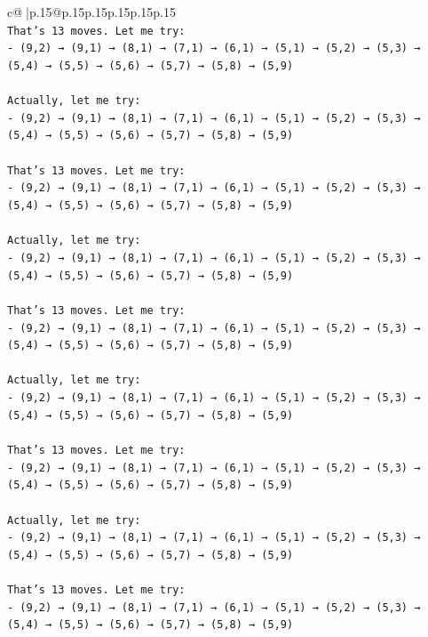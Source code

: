\documentclass{article}
\begin{document}
{\begin{supertabular}{c@{$\;$}|p{.15\linewidth}@{}p{.15\linewidth}p{.15\linewidth}p{.15\linewidth}p{.15\linewidth}p{.15\linewidth}}
{{{\\ 
\texttt{That's 13 moves. Let me try:} \\
\texttt{{-} (9,2) → (9,1) → (8,1) → (7,1) → (6,1) → (5,1) → (5,2) → (5,3) → (5,4) → (5,5) → (5,6) → (5,7) → (5,8) → (5,9)} \\
\\ 
\texttt{Actually, let me try:} \\
\texttt{{-} (9,2) → (9,1) → (8,1) → (7,1) → (6,1) → (5,1) → (5,2) → (5,3) → (5,4) → (5,5) → (5,6) → (5,7) → (5,8) → (5,9)} \\
\\ 
\texttt{That's 13 moves. Let me try:} \\
\texttt{{-} (9,2) → (9,1) → (8,1) → (7,1) → (6,1) → (5,1) → (5,2) → (5,3) → (5,4) → (5,5) → (5,6) → (5,7) → (5,8) → (5,9)} \\
\\ 
\texttt{Actually, let me try:} \\
\texttt{{-} (9,2) → (9,1) → (8,1) → (7,1) → (6,1) → (5,1) → (5,2) → (5,3) → (5,4) → (5,5) → (5,6) → (5,7) → (5,8) → (5,9)} \\
\\ 
\texttt{That's 13 moves. Let me try:} \\
\texttt{{-} (9,2) → (9,1) → (8,1) → (7,1) → (6,1) → (5,1) → (5,2) → (5,3) → (5,4) → (5,5) → (5,6) → (5,7) → (5,8) → (5,9)} \\
\\ 
\texttt{Actually, let me try:} \\
\texttt{{-} (9,2) → (9,1) → (8,1) → (7,1) → (6,1) → (5,1) → (5,2) → (5,3) → (5,4) → (5,5) → (5,6) → (5,7) → (5,8) → (5,9)} \\
\\ 
\texttt{That's 13 moves. Let me try:} \\
\texttt{{-} (9,2) → (9,1) → (8,1) → (7,1) → (6,1) → (5,1) → (5,2) → (5,3) → (5,4) → (5,5) → (5,6) → (5,7) → (5,8) → (5,9)} \\
\\ 
\texttt{Actually, let me try:} \\
\texttt{{-} (9,2) → (9,1) → (8,1) → (7,1) → (6,1) → (5,1) → (5,2) → (5,3) → (5,4) → (5,5) → (5,6) → (5,7) → (5,8) → (5,9)} \\
\\ 
\texttt{That's 13 moves. Let me try:} \\
\texttt{{-} (9,2) → (9,1) → (8,1) → (7,1) → (6,1) → (5,1) → (5,2) → (5,3) → (5,4) → (5,5) → (5,6) → (5,7) → (5,8) → (5,9)} \\
\\ 
}}}
\end{supertabular}}
\end{document}
